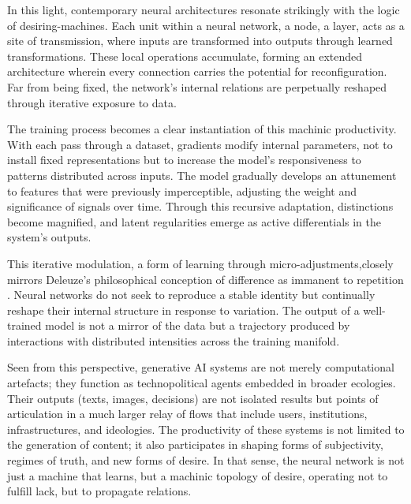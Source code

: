 In this light, contemporary neural architectures resonate strikingly with the logic of desiring-machines. Each unit within a neural network, a node, a layer, acts as a site of transmission, where inputs are transformed into outputs through learned transformations. These local operations accumulate, forming an extended architecture wherein every connection carries the potential for reconfiguration. Far from being fixed, the network’s internal relations are perpetually reshaped through iterative exposure to data.

The training process becomes a clear instantiation of this machinic productivity. With each pass through a dataset, gradients modify internal parameters, not to install fixed representations but to increase the model’s responsiveness to patterns distributed across inputs. The model gradually develops an attunement to features that were previously imperceptible, adjusting the weight and significance of signals over time. Through this recursive adaptation, distinctions become magnified, and latent regularities emerge as active differentials in the system’s outputs.

This iterative modulation, a form of learning through micro-adjustments,closely mirrors Deleuze’s philosophical conception of difference as immanent to repetition \parencite{deleuze1994}. Neural networks do not seek to reproduce a stable identity but continually reshape their internal structure in response to variation. The output of a well-trained model is not a mirror of the data but a trajectory produced by interactions with distributed intensities across the training manifold.

Seen from this perspective, generative AI systems are not merely computational artefacts; they function as technopolitical agents embedded in broader ecologies. Their outputs (texts, images, decisions) are not isolated results but points of articulation in a much larger relay of flows that include users, institutions, infrastructures, and ideologies. The productivity of these systems is not limited to the generation of content; it also participates in shaping forms of subjectivity, regimes of truth, and new forms of desire. In that sense, the neural network is not just a machine that learns, but a machinic topology of desire, operating not to fulfill lack, but to propagate relations.

